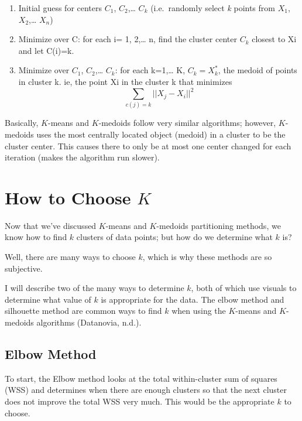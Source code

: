 \documentclass[12pt,twoside]{amherstthesis}
\begin{document}
  \begin{enumerate}
  \def\labelenumi{\arabic{enumi}.}
  \item
    Initial guess for centers \(C_1\), \(C_2\),\ldots{} \(C_k\)
    (i.e.~randomly select \emph{k} points from \(X_1\), \(X_2\),\ldots{}
    \(X_n\))
  \item
    Minimize over C: for each i= 1, 2,\ldots{} n, find the cluster center
    \(C_k\) closest to Xi and let C(i)=k.
  \item
    Minimize over \(C_1\), \(C_2\),\ldots{} \(C_k\): for each k=1,\ldots{}
    K, \(C_k = X_k^*\), the medoid of points in cluster k. ie, the point
    Xi in the cluster k that minimizes
    \[\sum  _{c(j)=k} ||{{X_j- X_i}}||^2\]
  \end{enumerate}
  
  Basically, \(K\)-means and \(K\)-medoids follow very similar algorithms;
  however, \(K\)-medoids uses the most centrally located object (medoid)
  in a cluster to be the cluster center. This causes there to only be at
  most one center changed for each iteration (makes the algorithm run
  slower).
  
  \section{\texorpdfstring{How to Choose
  \(K\)}{How to Choose K}}\label{how-to-choose-k}
  
  Now that we've discussed \(K\)-means and \(K\)-medoids partitioning
  methods, we know how to find \(k\) clusters of data points; but how do
  we determine what \(k\) is?
  
  Well, there are many ways to choose \(k\), which is why these methods
  are so subjective.
  
  I will describe two of the many ways to determine \(k\), both of which
  use visuals to determine what value of \(k\) is appropriate for the
  data. The elbow method and silhouette method are common ways to find
  \(k\) when using the \(K\)-means and \(K\)-medoids algorithms
  (Datanovia, n.d.).
  
  \subsection{Elbow Method}\label{elbow-method}
  
  To start, the Elbow method looks at the total within-cluster sum of
  squares (WSS) and determines when there are enough clusters so that the
  next cluster does not improve the total WSS very much. This would be the
  appropriate \(k\) to choose.
  
\end{document}
